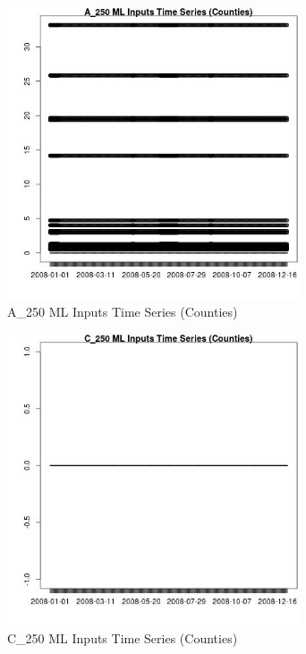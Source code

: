 \begin{figure} 
\centering  
\includegraphics[width=0.77\textwidth]{Code_Outputs/ML_input_report_ML_input_CountyGeometricCentroids_Locations_Dates_part_c_2008-01-01to2008-12-31_A_250TS.jpg} 
\caption{\label{fig:ML_input_report_ML_input_CountyGeometricCentroids_Locations_Dates_part_c_2008-01-01to2008-12-31A_250TS}A_250 ML Inputs Time Series (Counties)} 
\end{figure} 
 

\begin{figure} 
\centering  
\includegraphics[width=0.77\textwidth]{Code_Outputs/ML_input_report_ML_input_CountyGeometricCentroids_Locations_Dates_part_c_2008-01-01to2008-12-31_C_250TS.jpg} 
\caption{\label{fig:ML_input_report_ML_input_CountyGeometricCentroids_Locations_Dates_part_c_2008-01-01to2008-12-31C_250TS}C_250 ML Inputs Time Series (Counties)} 
\end{figure} 
 


